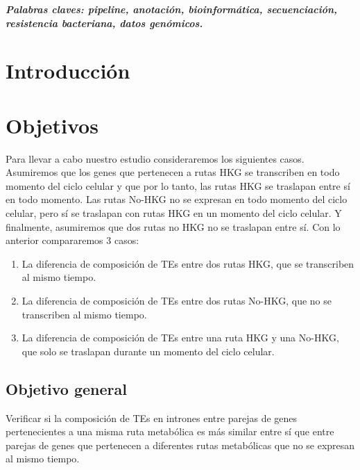 \documentclass[12pt]{article}
\begin{document}
\vspace{10pt}
\textbf{\emph{Palabras claves: pipeline, anotación, bioinformática, secuenciación, resistencia bacteriana, datos genómicos.}}



\newpage

\section{Introducción}


\section{Objetivos}
Para llevar a cabo nuestro estudio consideraremos los siguientes casos. Asumiremos que los genes que pertenecen a rutas HKG se transcriben en todo momento del ciclo celular y que por lo tanto, las rutas HKG se traslapan entre sí en todo momento. Las rutas No-HKG no se expresan en todo momento del ciclo celular, pero sí se traslapan con rutas HKG en un momento del ciclo celular. Y finalmente, asumiremos que dos rutas no HKG no se traslapan entre sí. Con lo anterior compararemos 3 casos: 
\begin{enumerate}
    \item La diferencia de composición de TEs entre dos rutas HKG, que se transcriben al mismo tiempo.
    \item La diferencia de composición de TEs entre dos rutas No-HKG, que no se transcriben al mismo tiempo.
    \item La diferencia de composición de TEs entre una ruta HKG y una No-HKG, que solo se traslapan durante un momento del ciclo celular.
\end{enumerate}
\subsection{Objetivo general}
Verificar si la composición de TEs en intrones entre parejas de genes pertenecientes a una misma ruta metabólica es más similar entre sí que entre parejas de genes que pertenecen a diferentes rutas metabólicas que no se expresan al mismo tiempo.
\end{document}
